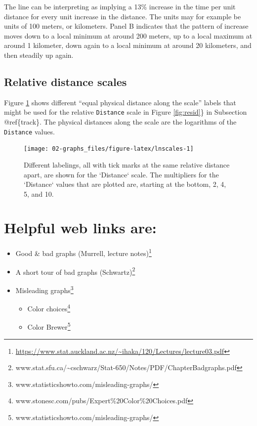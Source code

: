 \documentclass[
  10pt,
  b5paper]{book}
\providecommand{\tightlist}{%
  \setlength{\itemsep}{0pt}\setlength{\parskip}{0pt}}
\begin{document}
The line can be interpreting as implying a 13\% increase in the time
per unit distance for every unit increase in the distance. The units
may for example be units of 100 meters, or kilometers. Panel B
indicates that the pattern of increase moves down to a local minimum
at around 200 meters, up to a local maximum at around 1 kilometer, down
again to a local minimum at around 20 kilometers, and then steadily up
again.

\hypertarget{relative-distance-scales}{%
\subsection*{Relative distance scales}\label{relative-distance-scales}}

Figure \ref{fig:lnscales} shows different ``equal physical distance
along the scale'' labels that might be used for the relative
\texttt{Distance} scale in Figure \ref{fig:resid}\} in Subsection
@ref\{track\}. The physical distances along the scale are the
logarithms of the \texttt{Distance} values.

\begin{figure}[H]

{\centering \texttt{[image: 02-graphs\_files/figure-latex/lnscales-1]} 

}

\caption{Different labelings, all with tick marks at the same
relative distance apart, are shown for the `Distance` scale.
The multipliers for the `Distance` values that are plotted are,
starting at the bottom, 2, 4, 5, and 10.}\label{fig:lnscales}
\end{figure}

\hypertarget{helpful-web-links-are}{%
\section{Helpful web links are:}\label{helpful-web-links-are}}

\begin{itemize}
\tightlist
\item
  Good \& bad graphs (Murrell, lecture notes)\footnote{\url{https://www.stat.auckland.ac.nz/~ihaka/120/Lectures/lecture03.pdf}}
\item
  A short tour of bad graphs (Schwartz)\footnote{www.stat.sfu.ca/\textasciitilde cschwarz/Stat-650/Notes/PDF/ChapterBadgraphs.pdf}
\item
  Misleading graphs\footnote{www.statisticshowto.com/misleading-graphs/}

  \begin{itemize}
  \tightlist
  \item
    Color choices\footnote{www.stonesc.com/pubs/Expert\%20Color\%20Choices.pdf}
  \item
    Color Brewer\footnote{www.statisticshowto.com/misleading-graphs/}
  \end{itemize}
\end{itemize}
\end{document}
